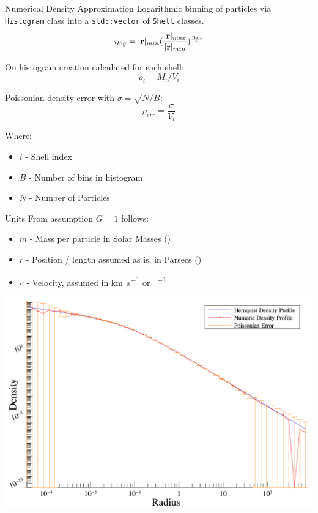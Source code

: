 \begin{frame}{Numerical Density Approximation}
	Logarithmic binning of particles via \texttt{Histogram} class into a \texttt{std::vector} of \texttt{Shell}
	classes.
	\begin{equation}
		i_{log} = |\vb{r}|_{min} (\frac{|\vb{r}|_{max}}{|\vb{r}|_{min}})^{\frac {i_{lin}}{n}}
		\label{eq:lin-to-log}
	\end{equation}

	On histogram creation calculated for each shell:
	\begin{equation}
		\rho_i = M_i / V_i
		\label{eq:numeric-density}
	\end{equation}

	Poissonian density error with $\sigma = \sqrt{N / B}$:
	\begin{equation}
		\rho_{err} = \frac{\sigma}{V_i}
		\label{eq:density-error}
	\end{equation}

	{\footnotesize Where:
	\begin{itemize}
		\item $i$ - Shell index
		\item $B$ - Number of bins in histogram
		\item $N$ - Number of Particles
	\end{itemize}}

\end{frame}

\begin{frame}{Units}
	From assumption $G=1$ follows:

	\begin{itemize}
		\item $m$ - Mass per particle in Solar Masses (\si{\solarmass})
		\item $r$ - Position / length assumed as is, in Parsecs (\si{\parsec})
		\item $v$ - Velocity, assumed in \si{\kilo\metre\per\second} or \si{\parsec\per\year}
	\end{itemize}
\end{frame}

\begin{frame}
	\includegraphics[width=.95\textwidth]{figures/plots/hernquist.png}
\end{frame}

